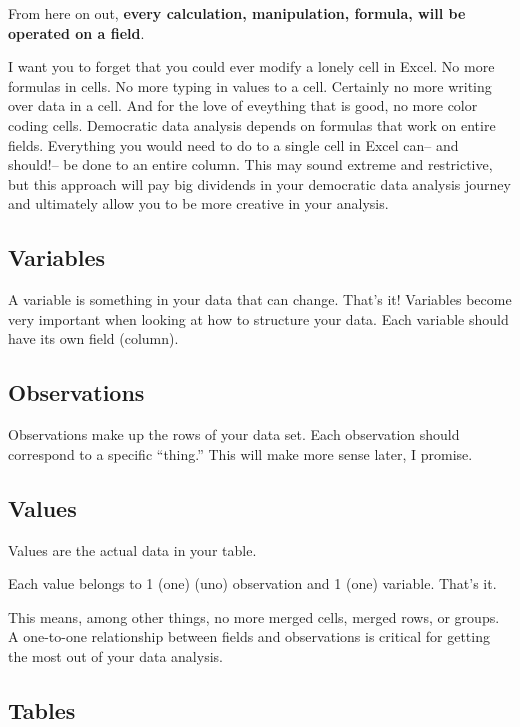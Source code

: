 \documentclass[]{book}
\begin{document}
From here on out, \textbf{every calculation, manipulation, formula, will be operated on a field}.

I want you to forget that you could ever modify a lonely cell in Excel. No more formulas in cells. No more typing in values to a cell. Certainly no more writing over data in a cell. And for the love of eveything that is good, no more color coding cells. Democratic data analysis depends on formulas that work on entire fields. Everything you would need to do to a single cell in Excel can-- and should!-- be done to an entire column. This may sound extreme and restrictive, but this approach will pay big dividends in your democratic data analysis journey and ultimately allow you to be more creative in your analysis.

\hypertarget{variables}{%
\subsection{Variables}\label{variables}}

A variable is something in your data that can change. That's it! Variables become very important when looking at how to structure your data. Each variable should have its own field (column).

\hypertarget{observations}{%
\subsection{Observations}\label{observations}}

Observations make up the rows of your data set. Each observation should correspond to a specific ``thing.'' This will make more sense later, I promise.

\hypertarget{values}{%
\subsection{Values}\label{values}}

Values are the actual data in your table.

Each value belongs to 1 (one) (uno) observation and 1 (one) variable. That's it.

This means, among other things, no more merged cells, merged rows, or groups. A one-to-one relationship between fields and observations is critical for getting the most out of your data analysis.

\hypertarget{tables}{%
\subsection{Tables}\label{tables}}
\end{document}
